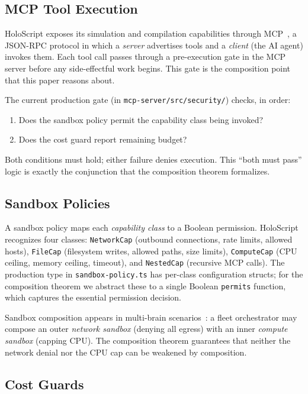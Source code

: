 \documentclass[sigconf]{acmart}
\begin{document}
\subsection{MCP Tool Execution}

HoloScript exposes its simulation and compilation capabilities through
MCP~\cite{mcp-spec}, a JSON-RPC protocol in which a \emph{server} advertises
tools and a \emph{client} (the AI agent) invokes them.  Each tool call passes
through a pre-execution gate in the MCP server before any side-effectful work
begins.  This gate is the composition point that this paper reasons about.

The current production gate (in \texttt{mcp-server/src/security/}) checks, in
order:

\begin{enumerate}
  \item Does the sandbox policy permit the capability class being invoked?
  \item Does the cost guard report remaining budget?
\end{enumerate}

Both conditions must hold; either failure denies execution.  This ``both must
pass'' logic is exactly the conjunction that the composition theorem
formalizes.

\subsection{Sandbox Policies}

A sandbox policy maps each \emph{capability class} to a Boolean permission.
HoloScript recognizes four classes: \texttt{NetworkCap} (outbound connections,
rate limits, allowed hosts), \texttt{FileCap} (filesystem writes, allowed
paths, size limits), \texttt{ComputeCap} (CPU ceiling, memory ceiling,
timeout), and \texttt{NestedCap} (recursive MCP calls).  The production type
in \texttt{sandbox-policy.ts} has per-class configuration structs; for the
composition theorem we abstract these to a single Boolean \texttt{permits}
function, which captures the essential permission decision.

Sandbox composition appears in multi-brain
scenarios~\cite{paper-4-sandbox-usenix}: a fleet orchestrator may compose an
outer \emph{network sandbox} (denying all egress) with an inner \emph{compute
sandbox} (capping CPU).  The composition theorem guarantees that neither the
network denial nor the CPU cap can be weakened by composition.

\subsection{Cost Guards}
\end{document}

